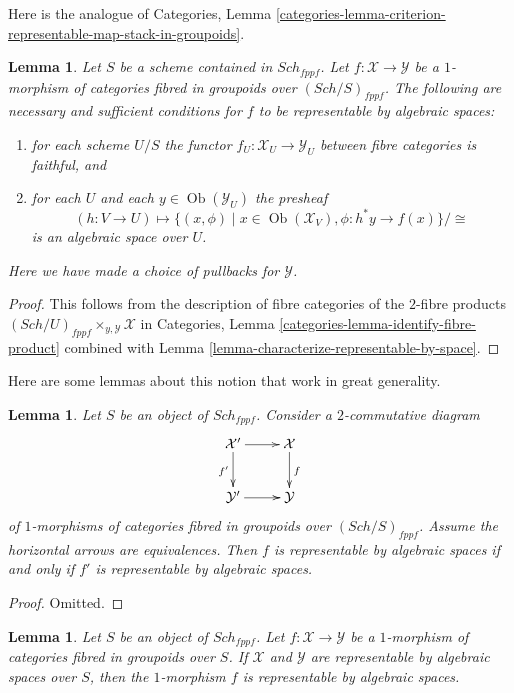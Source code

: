 \documentclass{stacks-project}
\theoremstyle{plain}
\newtheorem{lemma}[subsection]{Lemma}
\theoremstyle{definition}
\theoremstyle{remark}
\numberwithin{equation}{subsection}
\def\Sch{\mathit{Sch}}
\def\Ob{\mathop{\mathrm{Ob}}\nolimits}
\begin{document}
\medskip\noindent
Here is the analogue of Categories,
Lemma \ref{categories-lemma-criterion-representable-map-stack-in-groupoids}.

\begin{lemma}
\label{lemma-criterion-map-representable-spaces-fibred-in-groupoids}
Let $S$ be a scheme contained in $\Sch_{fppf}$.
Let $f : \mathcal{X} \to \mathcal{Y}$ be a $1$-morphism
of categories fibred in groupoids over $(\Sch/S)_{fppf}$.
The following are necessary and sufficient conditions for
$f$ to be representable by algebraic spaces:
\begin{enumerate}
\item for each scheme $U/S$ the
functor $f_U : \mathcal{X}_U \longrightarrow \mathcal{Y}_U$
between fibre categories is faithful, and
\item for each $U$ and each $y \in \Ob(\mathcal{Y}_U)$ the presheaf
$$
(h : V \to U)
\longmapsto
\{(x, \phi) \mid x \in \Ob(\mathcal{X}_V), \phi : h^*y \to f(x)\}/\cong
$$
is an algebraic space over $U$.
\end{enumerate}
Here we have made a choice of pullbacks for $\mathcal{Y}$.
\end{lemma}

\begin{proof}
This follows from the description of fibre categories of the $2$-fibre products
$(\Sch/U)_{fppf} \times_{y, \mathcal{Y}} \mathcal{X}$ in
Categories, Lemma \ref{categories-lemma-identify-fibre-product}
combined with
Lemma \ref{lemma-characterize-representable-by-space}.
\end{proof}

\noindent
Here are some lemmas about this notion that work in great generality.

\begin{lemma}
\label{lemma-representable-by-spaces-morphism-equivalent}
Let $S$ be an object of $\Sch_{fppf}$.
Consider a $2$-commutative diagram
$$
\xymatrix{
\mathcal{X}' \ar[r] \ar[d]_{f'} & \mathcal{X} \ar[d]^f \\
\mathcal{Y}' \ar[r] & \mathcal{Y}
}
$$
of $1$-morphisms of categories fibred in groupoids over
$(\Sch/S)_{fppf}$.
Assume the horizontal arrows are equivalences.
Then $f$ is representable by algebraic spaces
if and only if $f'$ is representable by algebraic spaces.
\end{lemma}

\begin{proof}
Omitted.
\end{proof}

\begin{lemma}
\label{lemma-morphism-spaces-gives-representable-by-spaces}
Let $S$ be an object of $\Sch_{fppf}$.
Let $f : \mathcal{X} \to \mathcal{Y}$
be a $1$-morphism of categories fibred in groupoids over $S$.
If $\mathcal{X}$ and $\mathcal{Y}$ are representable by
algebraic spaces over $S$, then the $1$-morphism $f$
is representable by algebraic spaces.
\end{lemma}
\end{document}
